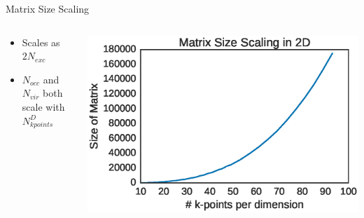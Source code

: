 \documentclass[10pt]{beamer}
\begin{document}
{{{{{{{{{{{{{{{{{\begin{frame}{Matrix Size Scaling}
	\begin{columns}[c] %
		\begin{column}{.4\textwidth}
			\begin{itemize}
				\item {Scales as $2N_{exc}$}
				\item {$N_{occ}$ and $N_{vir}$ both scale with $N_{kpoints}^D$}
			\end{itemize}				
		\end{column}
		\hfill
		\begin{column}{0.6\textwidth}
		    \begin{overprint}
			    \includegraphics[width=\linewidth]{../images/matscale.eps}

			\end{overprint}
		\end{column}	
	\end{columns}
\end{frame}


}}}}}}}}}}}}}}}}}
\end{document}
